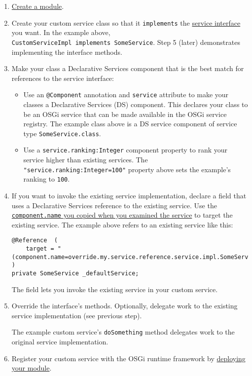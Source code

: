 \begin{enumerate}
\def\labelenumi{\arabic{enumi}.}
\item
  \href{/docs/7-2/reference/-/knowledge_base/r/creating-a-project}{Create
  a module}.
\item
  Create your custom service class so that it \texttt{implements} the
  \href{/docs/7-2/customization/-/knowledge_base/c/examining-an-osgi-service-to-override\#step-1-copy-the-service-interface-name}{service
  interface} you want. In the example above,
  \texttt{CustomServiceImpl\ implements\ SomeService}. Step 5 (later)
  demonstrates implementing the interface methods.
\item
  Make your class a Declarative Services component that is the best
  match for references to the service interface:

  \begin{itemize}
  \item
    Use an \texttt{@Component} annotation and \texttt{service} attribute
    to make your classes a Declarative Services (DS) component. This
    declares your class to be an OSGi service that can be made available
    in the OSGi service registry. The example class above is a DS
    service component of service type \texttt{SomeService.class}.
  \item
    Use a \texttt{service.ranking:Integer} component property to rank
    your service higher than existing services. The
    \texttt{"service.ranking:Integer=100"} property above sets the
    example's ranking to \texttt{100}.
  \end{itemize}
\item
  If you want to invoke the existing service implementation, declare a
  field that uses a Declarative Services reference to the existing
  service. Use the
  \href{/docs/7-2/customization/-/knowledge_base/c/examining-an-osgi-service-to-override\#step-2-copy-the-existing-service-name}{\texttt{component.name}
  you copied when you examined the service} to target the existing
  service. The example above refers to an existing service like this:

\begin{verbatim}
@Reference  (
    target = "(component.name=override.my.service.reference.service.impl.SomeServiceImpl)"
)
private SomeService _defaultService;
\end{verbatim}

  The field lets you invoke the existing service in your custom service.
\item
  Override the interface's methods. Optionally, delegate work to the
  existing service implementation (see previous step).

  The example custom service's \texttt{doSomething} method delegates
  work to the original service implementation.
\item
  Register your custom service with the OSGi runtime framework by
  \href{/docs/7-2/reference/-/knowledge_base/r/deploying-a-project}{deploying
  your module}.
\end{enumerate}

